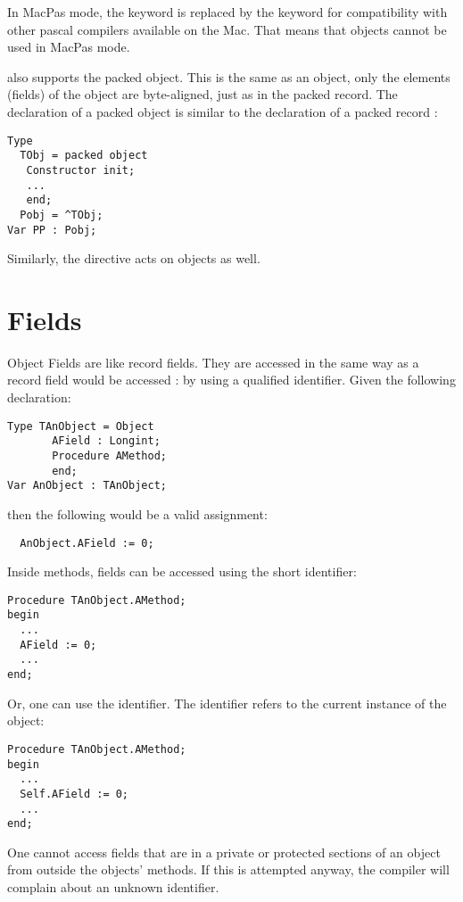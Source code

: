 \begin{remark}
In MacPas mode, the  keyword is replaced by the 
keyword for compatibility with other pascal compilers available on the Mac. 
That means that objects cannot be used in MacPas mode.
\end{remark}
\begin{remark}
\fpc also supports the packed object. This is the same as an object, only
the elements (fields) of the object are byte-aligned, just as in the packed
record.
The declaration of a packed object is similar to the declaration
of a packed record :
\begin{verbatim}
Type
  TObj = packed object
   Constructor init;
   ...
   end;
  Pobj = ^TObj;
Var PP : Pobj;
\end{verbatim}
Similarly, the  directive acts on objects as well.
\end{remark}

\section{Fields}
Object Fields are like record fields. They are accessed in the same way as
a record field  would be accessed : by using a qualified identifier. Given the
following declaration:
\begin{verbatim}
Type TAnObject = Object
       AField : Longint;
       Procedure AMethod;
       end;
Var AnObject : TAnObject;
\end{verbatim}
then the following would be a valid assignment:
\begin{verbatim}
  AnObject.AField := 0;
\end{verbatim}
Inside methods, fields can be accessed using the short identifier:
\begin{verbatim}
Procedure TAnObject.AMethod;
begin
  ...
  AField := 0;
  ...
end;
\end{verbatim}
Or, one can use the  identifier. The  identifier refers
to the current instance of the object:
\begin{verbatim}
Procedure TAnObject.AMethod;
begin
  ...
  Self.AField := 0;
  ...
end;
\end{verbatim}
One cannot access fields that are in a private or protected sections of an object from
outside the objects' methods. If this is attempted anyway, the compiler will complain about
an unknown identifier.

